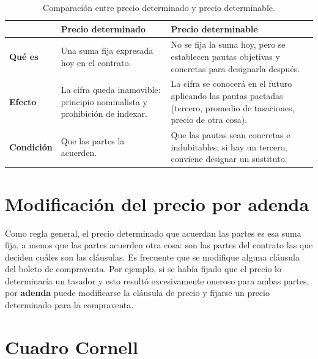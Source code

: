 \documentclass[12pt,oneside]{book}
\begin{document}
\begin{table}[H]
\centering
\renewcommand{\arraystretch}{1.3}
\begin{tabularx}{\linewidth}{@{}>{\raggedright\arraybackslash}p{2.4cm}>{\raggedright\arraybackslash}X>{\raggedright\arraybackslash}X@{}}
\toprule
 & \textbf{Precio determinado} & \textbf{Precio determinable} \\
\midrule
\textbf{Qu\'e es} & Una suma fija expresada hoy en el contrato. & No se fija la suma hoy, pero se establecen pautas objetivas y concretas para designarla despu\'es. \\
\textbf{Efecto} & La cifra queda inamovible: principio nominalista y prohibici\'on de indexar. & La cifra se conocer\'a en el futuro aplicando las pautas pactadas (tercero, promedio de tasaciones, precio de otra cosa). \\
\textbf{Condici\'on} & Que las partes la acuerden. & Que las pautas sean concretas e indubitables; si hay un tercero, conviene designar un sustituto. \\
\bottomrule
\end{tabularx}
\caption*{Comparaci\'on entre precio determinado y precio determinable.}
\end{table}

\section{Modificaci\'on del precio por adenda}

Como regla general, el precio determinado que acuerdan las partes es esa suma fija, a menos que las partes acuerden otra cosa: son las partes del contrato las que deciden cu\'ales son las cl\'ausulas. Es frecuente que se modifique alguna cl\'ausula del boleto de compraventa. Por ejemplo, si se hab\'ia fijado que el precio lo determinar\'ia un tasador y esto result\'o excesivamente oneroso para ambas partes, por \textbf{adenda} puede modificarse la cl\'ausula de precio y fijarse un precio determinado para la compraventa.


\section{Cuadro Cornell}
\end{document}
